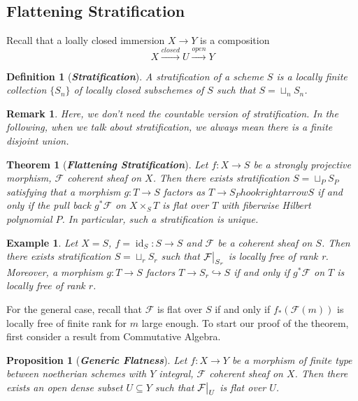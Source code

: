 \documentclass{ctexart}
\newtheorem{definition}{Definition}[section]
\newtheorem{remark}{Remark}[section]
\newtheorem{theorem}{Theorem}[section]
\newtheorem{proposition}{Proposition}[section]
\newtheorem{example}{Example}[section]
\newcommand{\identity}{\operatorname{id}}
\begin{document}
\subsection{Flattening Stratification}
Recall that a loally closed immersion $X \longrightarrow Y$ is a composition
\begin{equation*}
    X \overset{closed}{\longrightarrow} U \overset{open}{\longrightarrow} Y
\end{equation*}
\begin{definition}[\textbf{\emph{Stratification}}]
    A stratification of a scheme $S$ is a locally finite collection $\{S_{n}\}$ of locally closed subschemes of $S$ such that $S = \sqcup_{n} S_{n}$.
\end{definition}
\begin{remark}
    Here, we don't need the countable version of stratification.
    In the following, when we talk about stratification, we always mean there is a finite disjoint union.
\end{remark}
\begin{theorem}[\textbf{\emph{Flattening Stratification}}]
    Let $f: X \longrightarrow S$ be a strongly projective morphism, $\mathcal{F}$ coherent sheaf on $X$.
    Then there exists stratification $S = \sqcup_{P} S_{P}$ satisfying that a morphism $g: T \longrightarrow S$ factors as $T \longrightarrow S_{P} hookrightarrow S$ if and only if the pull back $g^{\ast}\mathcal{F}$ on $X \times_{S} T$ is flat over $T$ with fiberwise Hilbert polynomial $P$.
    In particular, such a stratification is unique.
    \label{Theorem 13.4}
\end{theorem}
\begin{example}
    Let $X = S$, $f = \identity_{S}: S \longrightarrow S$ and $\mathcal{F}$ be a coherent sheaf on $S$.
    Then there exists stratification $S = \sqcup_{r} S_{r}$ such that $\mathcal{F}\big{|}_{S_{r}}$ is locally free of rank r.
    Moreover, a morphism $g: T \longrightarrow S$ factors $T \longrightarrow S_{r} \hookrightarrow S$ if and only if $g^{\ast}\mathcal{F}$ on $T$ is locally free of rank $r$.
\end{example}
For the general case, recall that $\mathcal{F}$ is flat over $S$ if and only if $f_{\ast}(\mathcal{F}(m))$ is locally free of finite rank for $m$ large enough.
To start our proof of the theorem, first consider a result from Commutative Algebra.
\begin{proposition}[\textbf{\emph{Generic Flatness}}]
    Let $f: X \longrightarrow Y$ be a morphism of finite type between noetherian schemes with $Y$ integral, $\mathcal{F}$ coherent sheaf on $X$.
    Then there exists an open dense subset $U \subseteq Y$ such that $\mathcal{F}\big{|}_{U}$ is flat over $U$.
    \label{Proposition 13.2}
\end{proposition}
\end{document}
